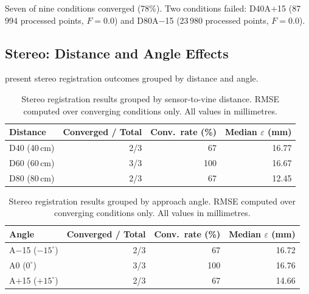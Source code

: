 Seven of nine conditions converged (78\%). Two conditions failed: D40A$+$15 (87\,994 processed points, $F = 0.0$) and D80A$-$15 (23\,980 processed points, $F = 0.0$).

\subsection{Stereo: Distance and Angle Effects}
\label{subsec:pa-results-stereo-distance-angle}

 present stereo registration outcomes grouped by distance and angle.

\begin{table}[htbp]
  \centering
  \caption{Stereo registration results grouped by sensor-to-vine distance. RMSE computed over converging conditions only. All values in millimetres.}
  \label{tab:pa-results-stereo-by-distance}
  \begin{tabular}{@{} l r r r @{}}
    \toprule
    \textbf{Distance} &
    \textbf{Converged / Total} &
    \textbf{Conv.\ rate (\%)} &
    \textbf{Median} \boldmath$\varepsilon$ \textbf{(mm)} \\
    \midrule
    D40 (40\,cm)   & 2/3 &  67 & 16.77 \\
    D60 (60\,cm)   & 3/3 & 100 & 16.67 \\
    D80 (80\,cm)   & 2/3 &  67 & 12.45 \\
    \bottomrule
  \end{tabular}
\end{table}

\begin{table}[htbp]
  \centering
  \caption{Stereo registration results grouped by approach angle. RMSE computed over converging conditions only. All values in millimetres.}
  \label{tab:pa-results-stereo-by-angle}
  \begin{tabular}{@{} l r r r @{}}
    \toprule
    \textbf{Angle} &
    \textbf{Converged / Total} &
    \textbf{Conv.\ rate (\%)} &
    \textbf{Median} \boldmath$\varepsilon$ \textbf{(mm)} \\
    \midrule
    A$-$15 ($-15^{\circ}$) & 2/3 &  67 & 16.72 \\
    A0 ($0^{\circ}$)       & 3/3 & 100 & 16.76 \\
    A$+$15 ($+15^{\circ}$) & 2/3 &  67 & 14.66 \\
    \bottomrule
  \end{tabular}
\end{table}

